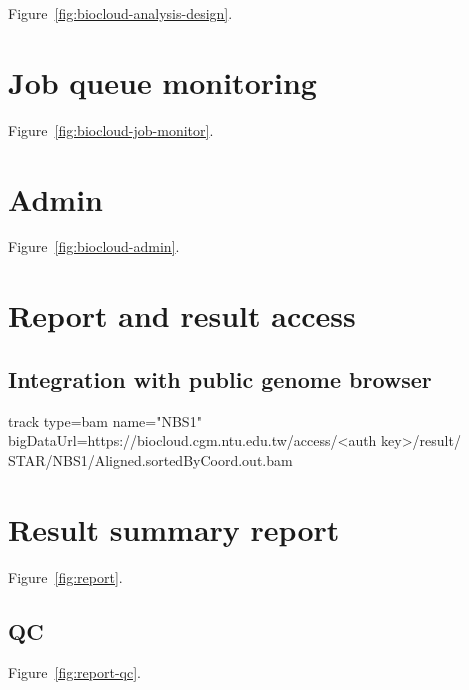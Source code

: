 Figure~\ref{fig:biocloud-analysis-design}.





\section{Job queue monitoring}

Figure~\ref{fig:biocloud-job-monitor}.




\section{Admin}
\label{s:biocloud-admin}

Figure~\ref{fig:biocloud-admin}.





\section{Report and result access}
\label{s:report-result-access}

\subsection{Integration with public genome browser}

\begin{CVerbatim}[fontsize=\small]
track type=bam name="NBS1"
bigDataUrl=https://biocloud.cgm.ntu.edu.tw/access/<auth key>/result/
STAR/NBS1/Aligned.sortedByCoord.out.bam
\end{CVerbatim}



\section{Result summary report}

Figure~\ref{fig:report}.



\subsection{QC}

Figure~\ref{fig:report-qc}.




